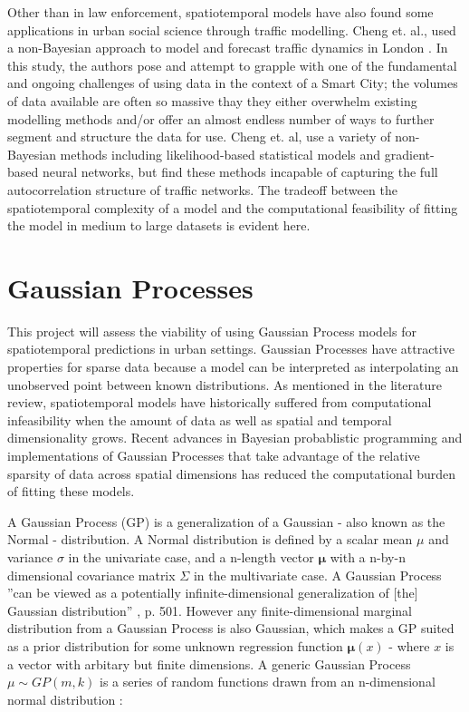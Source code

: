 Other than in law enforcement, spatiotemporal models have also found some applications in urban social science through traffic modelling. Cheng et. al., used a non-Bayesian approach to model and forecast traffic dynamics in London \cite{cheng_2012}. In this study, the authors pose and attempt to grapple with one of the fundamental and ongoing challenges of using data in the context of a Smart City; the volumes of data available are often so massive thay they either overwhelm existing modelling methods and/or offer an almost endless number of ways to further segment and structure the data for use. Cheng et. al, use a variety of non-Bayesian methods including likelihood-based statistical models and gradient-based neural networks, but find these methods incapable of capturing the full autocorrelation structure of traffic networks. The tradeoff between the spatiotemporal complexity of a model and the computational feasibility of fitting the model in medium to large datasets is evident here. \par



\section{Gaussian Processes}

This project will assess the viability of using Gaussian Process models for spatiotemporal predictions in urban settings. Gaussian Processes have attractive properties for sparse data because a model can be interpreted as interpolating an unobserved point between known distributions. As mentioned in the literature review, spatiotemporal models have historically suffered from computational infeasibility when the amount of data as well as spatial and temporal dimensionality grows. Recent advances in Bayesian probablistic programming and implementations of Gaussian Processes that take advantage of the relative sparsity of data across spatial dimensions has reduced the computational burden of fitting these models. \par

A Gaussian Process (GP) is a generalization of a Gaussian - also known as the Normal - distribution. A Normal distribution is defined by a scalar mean $\mu$ and variance $\sigma$ in the univariate case, and a n-length vector $\mathbf{\mu}$ with a n-by-n dimensional covariance matrix $\Sigma$ in the multivariate case. A Gaussian Process ''can be viewed as a potentially infinite-dimensional generalization of [the] Gaussian distribution'' \cite{gelman2013bayesian} , p. 501. However any finite-dimensional marginal distribution from a Gaussian Process is also Gaussian, which makes a GP suited as a prior distribution for some unknown regression function $\mathbf{\mu}(x)$ - where $x$ is a vector with arbitary but finite dimensions. A generic Gaussian Process $\mu \sim GP(m,k)$ is a series of random functions drawn from an n-dimensional normal distribution \cite{gelman2013bayesian}: \par

